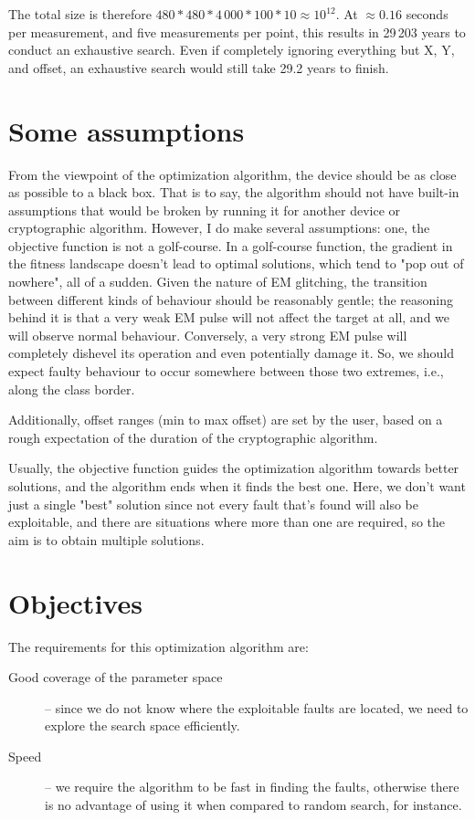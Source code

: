 \documentclass[times, utf8, diplomski]{fer}
\begin{document}
The total size is therefore $480*480*4\,000*100*10\approx 10^{12}$.
At $\approx0.16$ seconds per measurement, and five measurements per point, this
results in 29\,203 years to conduct an exhaustive search. Even if completely
ignoring everything but X, Y, and offset, an exhaustive search would still
take 29.2 years to finish.


\section{Some assumptions}\label{sec:assumptions}
From the viewpoint of the optimization algorithm, the device should be as close
as possible to a black box. That is to say, the algorithm should not have built-in
assumptions that would be broken by running it for another device or cryptographic
algorithm. However, I do make several assumptions:
one, the objective function is not a golf-course. In a golf-course function, the
gradient in the fitness landscape doesn't lead to optimal solutions, which tend
to "pop out of nowhere", all of a sudden. Given the nature of EM glitching, the
transition between different kinds of behaviour should be reasonably gentle; the
reasoning behind it is that a very weak EM pulse will not affect the target at all,
and we will observe normal behaviour. Conversely, a very strong EM pulse will
completely dishevel its operation and even potentially damage it. So, we should
expect faulty behaviour to occur somewhere between those two extremes, i.e.,
along the class border.

Additionally, offset ranges (min to max offset) are set by the user,
based on a rough expectation of the duration of the cryptographic algorithm.

Usually, the objective function guides the optimization algorithm towards better
solutions, and the algorithm ends when it finds the best one. Here, we don't want
just a single "best" solution since not every fault that's found will also be
exploitable, and there are situations where more than one are required, so the
aim is to obtain multiple solutions.


\section{Objectives}\label{sec:objectives}
The requirements for this optimization algorithm are:
\begin{description}
    \item[Good coverage of the parameter space] -- since we do not know where the
          exploitable faults are located, we need to explore the search space efficiently.
    \item[Speed] -- we require the algorithm to be fast in finding the faults, otherwise
          there is no advantage of using it when compared to random search, for instance.
\end{description}
\end{document}
